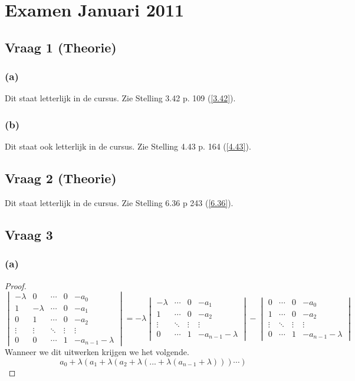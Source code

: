 \documentclass[lineaire_algebra_oplossingen.tex]{subfiles}
\begin{document}
\section{Examen Januari 2011}

\subsection{Vraag 1 (Theorie)}
\subsubsection*{(a)}
Dit staat letterlijk in de cursus.
Zie Stelling 3.42 p. 109 (\ref{3.42}).

\subsubsection*{(b)}
Dit staat ook letterlijk in de cursus.
Zie Stelling 4.43 p. 164 (\ref{4.43}).

\subsection{Vraag 2 (Theorie)}
Dit staat letterlijk in de cursus.
Zie Stelling 6.36 p 243 (\ref{6.36}).


\subsection{Vraag 3}
\subsubsection*{(a)}
\begin{proof}
\[
\begin{vmatrix}
-\lambda & 0 & \cdots & 0 & -a_0\\
1 & -\lambda & \cdots & 0 & -a_1\\
0 & 1 & \cdots & 0 & -a_2\\
\vdots & \vdots & \ddots & \vdots & \vdots\\
0 & 0 & \cdots & 1 & -a_{n-1}-\lambda
\end{vmatrix}
=
-\lambda
\begin{vmatrix}
-\lambda & \cdots & 0 & -a_1\\
1 & \cdots & 0 & -a_2\\
\vdots & \ddots & \vdots & \vdots\\
0 & \cdots & 1 & -a_{n-1}-\lambda
\end{vmatrix}
-
\begin{vmatrix}
0 & \cdots & 0 & -a_0\\
1 & \cdots & 0 & -a_2\\
\vdots & \ddots & \vdots & \vdots\\
0 & \cdots & 1 & -a_{n-1}-\lambda
\end{vmatrix}
\]
Wanneer we dit uitwerken krijgen we het volgende.
\[
a_0 + \lambda(a_1 + \lambda(a_2 + \lambda(... + \lambda(a_{n-1} + \lambda)))\cdots)
\]
\end{proof}
\end{document}
